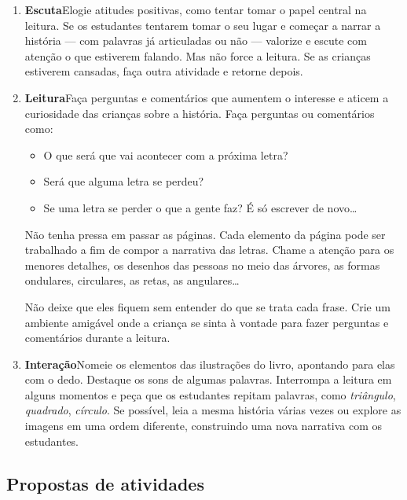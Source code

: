 \documentclass[11pt]{extarticle}
\begin{document}
\begin{enumerate}
\item \textbf{Escuta}\quad Elogie atitudes positivas, como 
tentar tomar o papel central na leitura. Se os estudantes tentarem 
tomar o seu lugar e começar a narrar a história --- com palavras já articuladas 
ou não --- valorize e escute com atenção o que estiverem falando. Mas não 
force a leitura. Se as crianças estiverem cansadas, faça outra atividade 
e retorne depois. 

\item \textbf{Leitura}\quad Faça perguntas e comentários que aumentem o 
interesse e aticem a curiosidade das crianças sobre a história. Faça 
perguntas ou comentários como: 

\begin{itemize}
\item O que será que vai acontecer com a próxima letra?
\item Será que alguma letra se perdeu?
\item Se uma letra se perder o que a gente faz? É só escrever de novo\dots{}
\end{itemize}

Não tenha pressa em passar as páginas. Cada elemento da página pode ser
trabalhado a fim de compor a narrativa das letras. Chame a atenção para
os menores detalhes, os desenhos das pessoas no meio das árvores,
as formas ondulares, circulares, as retas, as angulares\dots{}

Não deixe que eles fiquem sem entender do que se trata cada frase. Crie 
um ambiente amigável onde a criança se sinta à vontade para fazer 
perguntas e comentários durante a leitura.


\item \textbf{Interação}\quad Nomeie os elementos das ilustrações 
do livro, apontando para elas com o dedo. Destaque os sons de algumas 
palavras. Interrompa a leitura em alguns momentos e peça que 
os estudantes repitam palavras, como \textit{triângulo}, \textit{quadrado}, \textit{círculo}. Se possível, 
leia a mesma história várias vezes ou explore as imagens em uma ordem 
diferente, construindo uma nova narrativa com os estudantes. 
\end{enumerate}


\subsection{Propostas de atividades}

\end{document}
